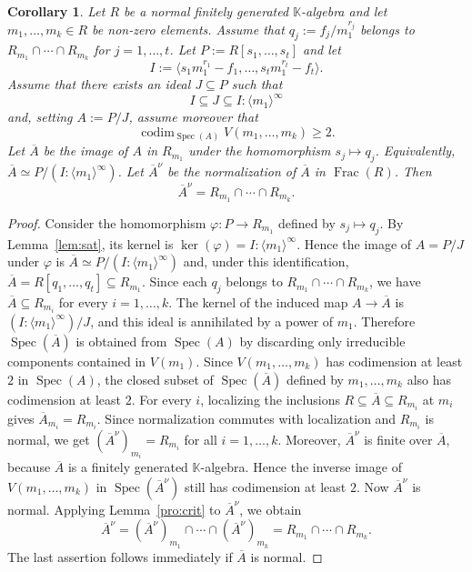 \documentclass{amsart}
\newtheorem{corollary}[theorem]{Corollary}
\theoremstyle{definition}
\theoremstyle{remark}
\begin{document}
\begin{corollary}
\label{cor:r2}
Let $R$ be a normal finitely generated $\mathbb K$-algebra and let
$m_1,\dots,m_k\in R$ be non-zero elements. Assume that
$q_j:=f_j/m_1^{r_j}$ belongs to $R_{m_1}\cap\cdots\cap R_{m_k}$ for
$j=1,\dots,t$. Let $P:=R[s_1,\dots,s_t]$ and let
\[
I:=\langle s_1m_1^{r_1}-f_1,\dots,s_tm_1^{r_t}-f_t\rangle.
\]
Assume that there exists an ideal $J\subseteq P$ such that
\[
I\subseteq J\subseteq I:\langle m_1\rangle^\infty
\]
and, setting $A:=P/J$, assume moreover that
\[
\operatorname{codim}_{\operatorname{Spec}(A)}V(m_1,\dots,m_k)\geq 2.
\]
Let $\overline A$ be the image of $A$ in $R_{m_1}$ under the homomorphism
$s_j\mapsto q_j$. Equivalently, $\overline A\simeq P/(I:\langle m_1\rangle^\infty)$.
Let $\overline A^\nu$ be the normalization of $\overline A$ in
$\operatorname{Frac}(R)$. Then
\[
\overline A^\nu=R_{m_1}\cap\cdots\cap R_{m_k}.
\]
\end{corollary}
\begin{proof}
Consider the homomorphism $\varphi:P\to R_{m_1}$ defined by
$s_j\mapsto q_j$. By Lemma~\ref{lem:sat}, its kernel is
$\ker(\varphi)=I:\langle m_1\rangle^\infty$. Hence the image of $A=P/J$
under $\varphi$ is $\overline A\simeq P/(I:\langle m_1\rangle^\infty)$ and,
under this identification, $\overline A=R[q_1,\dots,q_t]\subseteq R_{m_1}$.
Since each $q_j$ belongs to $R_{m_1}\cap\cdots\cap R_{m_k}$, we have
$\overline A\subseteq R_{m_i}$ for every $i=1,\dots,k$.
The kernel of the induced map $A\to\overline A$ is
$(I:\langle m_1\rangle^\infty)/J$, and this ideal is annihilated by a power of
$m_1$. Therefore $\operatorname{Spec}(\overline A)$ is obtained from
$\operatorname{Spec}(A)$ by discarding only irreducible components contained
in $V(m_1)$. Since $V(m_1,\dots,m_k)$ has codimension at least $2$ in
$\operatorname{Spec}(A)$, the closed subset of $\operatorname{Spec}(\overline A)$
defined by $m_1,\dots,m_k$ also has codimension at least $2$.
For every $i$, localizing the inclusions
$R\subseteq\overline A\subseteq R_{m_i}$ at $m_i$ gives
$\overline A_{m_i}=R_{m_i}$. Since normalization commutes with localization
and $R_{m_i}$ is normal, we get $(\overline A^\nu)_{m_i}=R_{m_i}$ for all
$i=1,\dots,k$. Moreover, $\overline A^\nu$ is finite over $\overline A$,
because $\overline A$ is a finitely generated $\mathbb K$-algebra. Hence the
inverse image of $V(m_1,\dots,m_k)$ in $\operatorname{Spec}(\overline A^\nu)$
still has codimension at least $2$.
Now $\overline A^\nu$ is normal. Applying Lemma~\ref{pro:crit} to
$\overline A^\nu$, we obtain
\[
\overline A^\nu
=
(\overline A^\nu)_{m_1}\cap\cdots\cap(\overline A^\nu)_{m_k}
=
R_{m_1}\cap\cdots\cap R_{m_k}.
\]
The last assertion follows immediately if $\overline A$ is normal.
\end{proof}
\end{document}
